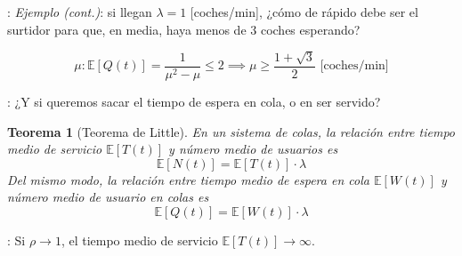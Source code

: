 \documentclass[xcolor={x11names}]{beamer}
\newtheorem{thm}{Teorema}[section] %
\begin{document}
\begin{frame}{\secname: \subsecname}
    \textit{Ejemplo (cont.)}:
    si llegan $\lambda=1$ [coches/min],
    ¿cómo de rápido debe ser el surtidor
    para que, en media,
    haya menos de 3 coches esperando?

    \begin{equation}
        \mu: \mathbb{E}[Q(t)] = \frac{1}{\mu^2-\mu}\leq 2 \implies \mu\geq \frac{1+\sqrt{3}}{2}\text{ [coches/min]}
    \end{equation}


    \begin{figure}
        
    \end{figure}
\end{frame}






\begin{frame}{\secname: \subsecname}
    ¿Y si queremos sacar el tiempo 
    de espera en cola, o en ser servido?
    \pause

    \begin{thm}[Teorema de Little]
        En un sistema de colas,
        la relación entre tiempo medio
        de servicio $\mathbb{E}[T(t)]$
        y número medio de usuarios es
        \begin{equation}
            \mathbb{E}[N(t)] =
            \mathbb{E}[T(t)]\cdot \lambda
        \end{equation}
        Del mismo modo, la relación
        entre tiempo medio de espera
        en cola $\mathbb{E}[W(t)]$ y
        número medio de usuario en colas es
        \begin{equation}
            \mathbb{E}[Q(t)] =
            \mathbb{E}[W(t)]\cdot \lambda
        \end{equation}
    \end{thm}
\end{frame}



\begin{frame}{\secname: \subsecname}
    Si $\rho\to1$, el tiempo medio de servicio
    $\mathbb{E}[T(t)]\to\infty$.

    \vfill

    \begin{figure}
        
    \end{figure}

\end{frame}
\end{document}
